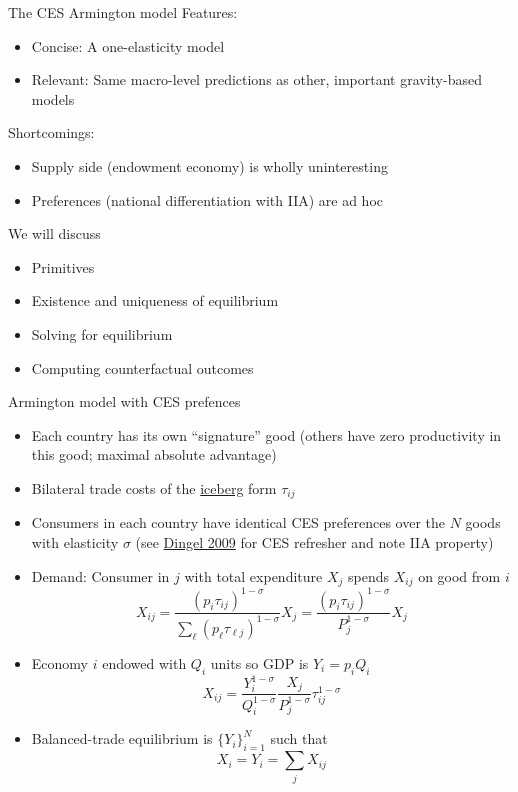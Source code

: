 \documentclass[10pt,notes=hide,aspectratio=169]{beamer}
\begin{document}
\begin{frame}{The CES Armington model}
Features:
\begin{itemize}
\item Concise: A one-elasticity model
\item Relevant: Same macro-level predictions as other, important gravity-based models
\end{itemize}
Shortcomings:
\begin{itemize}
\item Supply side (endowment economy) is wholly uninteresting 
\item Preferences (national differentiation with IIA) are ad hoc
\end{itemize}
We will discuss
\begin{itemize}
\item Primitives
\item Existence and uniqueness of equilibrium
\item Solving for equilibrium
\item Computing counterfactual outcomes
\end{itemize}
\end{frame}
\begin{frame}{Armington model with CES prefences}
\begin{itemize}
	\item Each country has its own ``signature'' good (others have zero productivity in this good; maximal absolute advantage)
	\item Bilateral trade costs of the \href{https://tradediversion.net/2019/10/28/whats-an-iceberg-commuting-cost/}{iceberg} form $\tau_{ij}$
	\item Consumers in each country have identical CES preferences over the $N$ goods with elasticity $\sigma$
	(see \href{http://www.columbia.edu/~jid2106/td/dixitstiglitzbasics.pdf}{Dingel 2009} for CES refresher and note IIA property)
	\item Demand: Consumer in $j$ with total expenditure $X_j$ spends $X_{ij}$ on good from $i$
	\begin{equation*}
	X_{ij}	= \frac{(p_i\tau_{ij} )^{1-\sigma}}{\sum_{\ell} (p_\ell\tau_{\ell j})^{1-\sigma}} X_j
			= \frac{(p_i\tau_{ij} )^{1-\sigma}}{P_j^{1-\sigma}} X_j
	\end{equation*}
	\item Economy $i$ endowed with $Q_i$ units so GDP is $Y_i = p_i Q_i$
	\begin{equation*}
	X_{ij}	= \frac{Y_i^{1-\sigma}}{Q_i^{1-\sigma}} \frac{X_j}{P_j^{1-\sigma}}\tau_{ij}^{1-\sigma}
	\end{equation*}
	\item Balanced-trade equilibrium is $\{Y_i\}_{i=1}^{N}$ such that 
	\begin{equation*}
	X_i = Y_i = \sum_j X_{ij}
	\end{equation*}
\end{itemize}
\end{frame}
\end{document}
